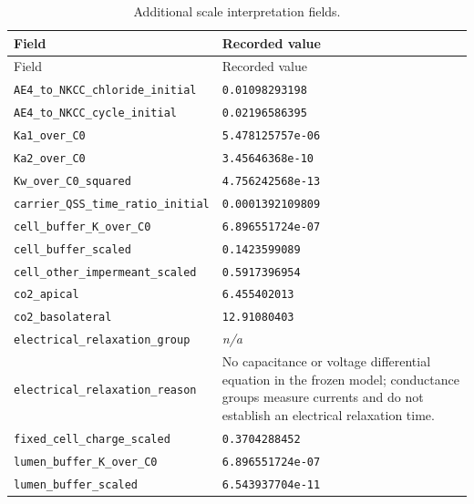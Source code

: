 \begingroup\scriptsize
\setlength{\tabcolsep}{3pt}
\begin{longtable}{p{.46\linewidth}p{.46\linewidth}}
\caption{Additional scale interpretation fields.}\\
\toprule
Field & Recorded value \\
\midrule\endfirsthead
\toprule
Field & Recorded value \\
\midrule\endhead
\bottomrule\endfoot
\nolinkurl{AE4_to_NKCC_chloride_initial} & \texttt{0.01098293198} \\
\nolinkurl{AE4_to_NKCC_cycle_initial} & \texttt{0.02196586395} \\
\nolinkurl{Ka1_over_C0} & \texttt{5.478125757e-06} \\
\nolinkurl{Ka2_over_C0} & \texttt{3.45646368e-10} \\
\nolinkurl{Kw_over_C0_squared} & \texttt{4.756242568e-13} \\
\nolinkurl{carrier_QSS_time_ratio_initial} & \texttt{0.0001392109809} \\
\nolinkurl{cell_buffer_K_over_C0} & \texttt{6.896551724e-07} \\
\nolinkurl{cell_buffer_scaled} & \texttt{0.1423599089} \\
\nolinkurl{cell_other_impermeant_scaled} & \texttt{0.5917396954} \\
\nolinkurl{co2_apical} & \texttt{6.455402013} \\
\nolinkurl{co2_basolateral} & \texttt{12.91080403} \\
\nolinkurl{electrical_relaxation_group} & \textit{n/a} \\
\nolinkurl{electrical_relaxation_reason} & No capacitance or voltage differential equation in the frozen model; conductance groups measure currents and do not establish an electrical relaxation time. \\
\nolinkurl{fixed_cell_charge_scaled} & \texttt{0.3704288452} \\
\nolinkurl{lumen_buffer_K_over_C0} & \texttt{6.896551724e-07} \\
\nolinkurl{lumen_buffer_scaled} & \texttt{6.543937704e-11} \\
\end{longtable}
\endgroup



